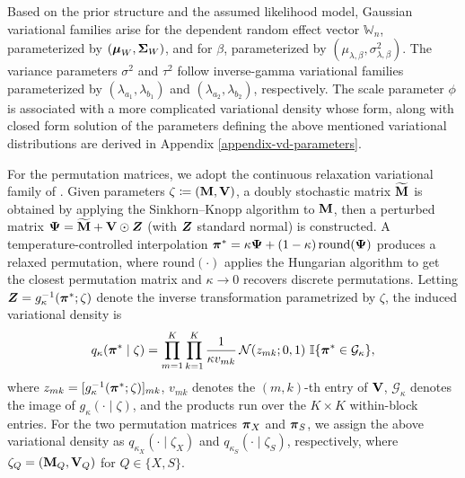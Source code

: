 \documentclass[numsec,webpdf,modern,medium,namedate]{oup-authoring-template}
\theoremstyle{thmstyleone}%
\theoremstyle{thmstyletwo}%
\theoremstyle{thmstylethree}%
\begin{document}
Based on the prior structure and the assumed likelihood model, Gaussian variational families arise for the dependent random effect vector $\mathbb{W}_n$, parameterized by $(\boldsymbol{\mu}_W,\boldsymbol{\Sigma}_W)$, and for $\beta$, parameterized by $(\mu_{\lambda,\beta},\sigma^2_{\lambda,\beta})$. The variance parameters $\sigma^2$ and $\tau^2$ follow inverse-gamma variational families parameterized by $(\lambda_{a_1},\lambda_{b_1})$ and $(\lambda_{a_2},\lambda_{b_2})$, respectively. The scale parameter $\phi$ is associated with a more complicated variational density whose form, along with closed form solution of the parameters defining the above mentioned variational distributions are derived in Appendix \ref{appendix-vd-parameters}.

For the permutation matrices, we adopt the continuous relaxation variational family of \cite{linderman2018reparameterizing}. Given parameters $\zeta \coloneq (\mathbf{M},\mathbf{V})$, a doubly stochastic matrix $\widetilde{\mathbf{M}}$ is obtained by applying the Sinkhorn--Knopp algorithm \citep{sinkhorn1967concerning} to $\mathbf{M}$, then a perturbed matrix $\boldsymbol{\Psi} = \widetilde{\mathbf{M}} + \mathbf{V} \odot \boldsymbol{Z}$ (with $\boldsymbol{Z}$ standard normal) is constructed. A temperature-controlled interpolation
$\boldsymbol{\pi}^\ast = \kappa \boldsymbol{\Psi} + (1-\kappa)\,\text{round}(\boldsymbol{\Psi})$
produces a relaxed permutation, where $\text{round}(\cdot)$ applies the Hungarian algorithm \citep{kuhn1955hungarian} to get the closest permutation matrix and $\kappa \to 0$ recovers discrete permutations. Letting $\boldsymbol{Z} = g_{\kappa}^{-1}(\boldsymbol{\pi}^\ast;\zeta)$ denote the inverse transformation parametrized by $\zeta$, the induced variational density is
\begin{equation}\label{eq:perm-vd}
    q_{\kappa}(\boldsymbol{\pi}^\ast\mid\zeta)
=
\prod_{m=1}^K \prod_{k=1}^K
\frac{1}{\kappa v_{mk}}
\,
\mathcal{N}\!\left(z_{mk};0,1\right)
\,\mathbb{I}\{\boldsymbol{\pi}^\ast \in \mathcal{G}_{\kappa}\},
\end{equation}
where $z_{mk} = [g_{\kappa}^{-1}(\boldsymbol{\pi}^\ast;\zeta)]_{mk}$, $v_{mk}$ denotes the $(m,k)$-th entry of $\mathbf{V}$, $\mathcal{G}_{\kappa}$ denotes the image of $g_\kappa(\cdot\mid \zeta)$, and the products run over the $K\times K$ within-block entries. For the two permutation matrices $\boldsymbol{\pi}_X$ and $\boldsymbol{\pi}_S$, we assign the above variational density as $q_{\kappa_X}(\cdot\mid \zeta_X)$ and $q_{\kappa_S}(\cdot\mid \zeta_S)$, respectively, where $\zeta_Q = (\mathbf{M}_Q,\mathbf{V}_Q)$ for $Q\in \{X,S\}$.
\end{document}
